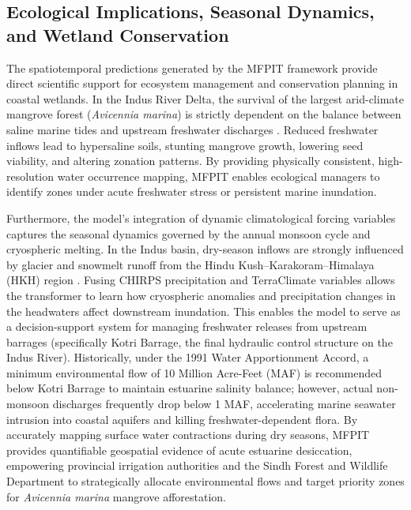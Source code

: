 \documentclass[preprint,12pt]{elsarticle}
\begin{document}
\subsection{Ecological Implications, Seasonal Dynamics, and Wetland Conservation}
The spatiotemporal predictions generated by the MFPIT framework provide direct scientific support for ecosystem management and conservation planning in coastal wetlands. In the Indus River Delta, the survival of the largest arid-climate mangrove forest (\textit{Avicennia marina}) is strictly dependent on the balance between saline marine tides and upstream freshwater discharges \cite{haider_gridded_2025, nanditha_pakistan_2023, bazai_exploring_2025}. Reduced freshwater inflows lead to hypersaline soils, stunting mangrove growth, lowering seed viability, and altering zonation patterns. By providing physically consistent, high-resolution water occurrence mapping, MFPIT enables ecological managers to identify zones under acute freshwater stress or persistent marine inundation. 

Furthermore, the model's integration of dynamic climatological forcing variables captures the seasonal dynamics governed by the annual monsoon cycle and cryospheric melting. In the Indus basin, dry-season inflows are strongly influenced by glacier and snowmelt runoff from the Hindu Kush--Karakoram--Himalaya (HKH) region \cite{immerzeel_science_2010, lutz_consistent_2014, arshad_anthropogenic_2025}. Fusing CHIRPS precipitation and TerraClimate variables allows the transformer to learn how cryospheric anomalies and precipitation changes in the headwaters affect downstream inundation. This enables the model to serve as a decision-support system for managing freshwater releases from upstream barrages (specifically Kotri Barrage, the final hydraulic control structure on the Indus River). Historically, under the 1991 Water Apportionment Accord, a minimum environmental flow of 10 Million Acre-Feet (MAF) is recommended below Kotri Barrage to maintain estuarine salinity balance; however, actual non-monsoon discharges frequently drop below 1 MAF, accelerating marine seawater intrusion into coastal aquifers and killing freshwater-dependent flora. By accurately mapping surface water contractions during dry seasons, MFPIT provides quantifiable geospatial evidence of acute estuarine desiccation, empowering provincial irrigation authorities and the Sindh Forest and Wildlife Department to strategically allocate environmental flows and target priority zones for \textit{Avicennia marina} mangrove afforestation.
\end{document}

